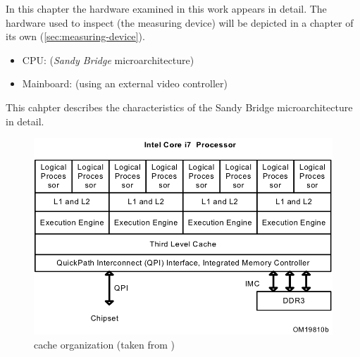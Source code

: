 \label{sec:technical-prerequisites}

In this chapter the hardware examined in this work appears in detail. The
hardware used to inspect (the measuring device) will be depicted in a
chapter of its own (\ref{sec:measuring-device}).

\label{sec:hw-products}

\begin{itemize}

\item CPU: \JWPLcpu{} (\emph{Sandy Bridge}\cite{wiki:snb} microarchitecture)

\item Mainboard: \JWPLboard{} (using an external video controller)

\end{itemize}


\label{sec:sandy-bridge}

This cahpter describes the characteristics of the Sandy Bridge microarchitecture
in detail.

\begin{figure}
  \centering
    \includegraphics[width=\textwidth]{fig/intel-cache-orga.png}
  \caption{\JWPcpu{} cache organization (taken from \cite{intel2011softdev1})}
  \label{fig:cache-orga}
\end{figure}


\label{sec:sandy-brige-general}

